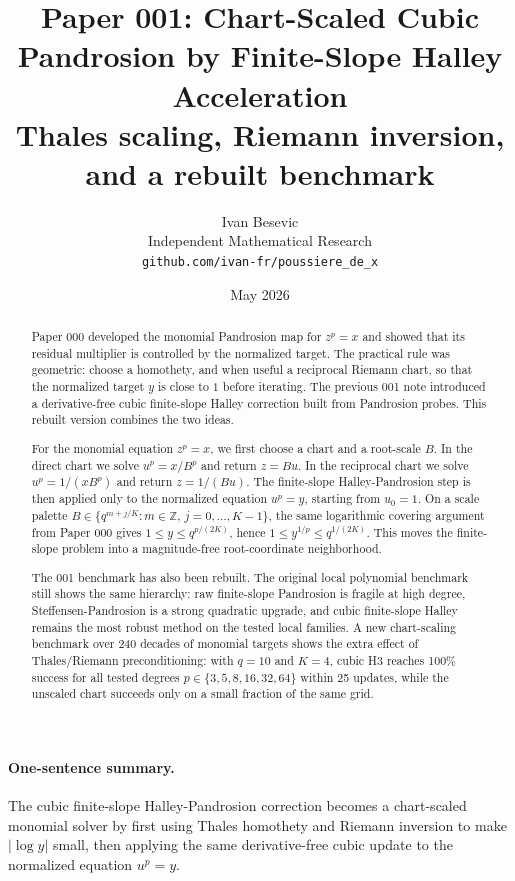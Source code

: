 \documentclass[11pt]{article}
\title{Paper 001: Chart-Scaled Cubic Pandrosion by Finite-Slope Halley Acceleration\\
\large Thales scaling, Riemann inversion, and a rebuilt benchmark}
\author{Ivan Besevic\\Independent Mathematical Research\\\texttt{github.com/ivan-fr/poussiere\_de\_x}}
\date{May 2026}
\begin{document}
\maketitle

\begin{abstract}
Paper 000 developed the monomial Pandrosion map for $z^p=x$ and showed that its residual multiplier is controlled by the normalized target.  The practical rule was geometric: choose a homothety, and when useful a reciprocal Riemann chart, so that the normalized target $y$ is close to $1$ before iterating.  The previous 001 note introduced a derivative-free cubic finite-slope Halley correction built from Pandrosion probes.  This rebuilt version combines the two ideas.

For the monomial equation $z^p=x$, we first choose a chart and a root-scale $B$.  In the direct chart we solve $u^p=x/B^p$ and return $z=Bu$.  In the reciprocal chart we solve $u^p=1/(xB^p)$ and return $z=1/(Bu)$.  The finite-slope Halley-Pandrosion step is then applied only to the normalized equation $u^p=y$, starting from $u_0=1$.  On a scale palette $B\in\{q^{m+j/K}:m\in\mathbb Z,\,j=0,\ldots,K-1\}$, the same logarithmic covering argument from Paper 000 gives $1\le y\le q^{p/(2K)}$, hence $1\le y^{1/p}\le q^{1/(2K)}$.  This moves the finite-slope problem into a magnitude-free root-coordinate neighborhood.

The 001 benchmark has also been rebuilt.  The original local polynomial benchmark still shows the same hierarchy: raw finite-slope Pandrosion is fragile at high degree, Steffensen-Pandrosion is a strong quadratic upgrade, and cubic finite-slope Halley remains the most robust method on the tested local families.  A new chart-scaling benchmark over 240 decades of monomial targets shows the extra effect of Thales/Riemann preconditioning: with $q=10$ and $K=4$, cubic H3 reaches 100\% success for all tested degrees $p\in\{3,5,8,16,32,64\}$ within 25 updates, while the unscaled chart succeeds only on a small fraction of the same grid.
\end{abstract}

\paragraph{One-sentence summary.}
The cubic finite-slope Halley-Pandrosion correction becomes a chart-scaled monomial solver by first using Thales homothety and Riemann inversion to make $|\log y|$ small, then applying the same derivative-free cubic update to the normalized equation $u^p=y$.
\end{document}
